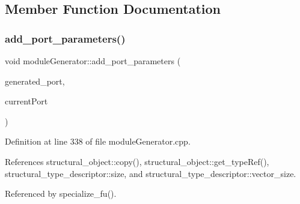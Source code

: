 \subsection{Member Function Documentation}
\mbox{\label{classmoduleGenerator_a5dde4d1e5f2526b1fdd1edab7777a475}} 
\subsubsection{\texorpdfstring{add\+\_\+port\+\_\+parameters()}{add\_port\_parameters()}}
{\footnotesize\ttfamily void module\+Generator\+::add\+\_\+port\+\_\+parameters (\begin{DoxyParamCaption}\item[{\hyperlink{structural__objects_8hpp_a8ea5f8cc50ab8f4c31e2751074ff60b2}{structural\+\_\+object\+Ref}}]{generated\+\_\+port,  }\item[{\hyperlink{structural__objects_8hpp_a8ea5f8cc50ab8f4c31e2751074ff60b2}{structural\+\_\+object\+Ref}}]{current\+Port }\end{DoxyParamCaption})}



Definition at line 338 of file module\+Generator.\+cpp.



References structural\+\_\+object\+::copy(), structural\+\_\+object\+::get\+\_\+type\+Ref(), structural\+\_\+type\+\_\+descriptor\+::size, and structural\+\_\+type\+\_\+descriptor\+::vector\+\_\+size.



Referenced by specialize\+\_\+fu().

